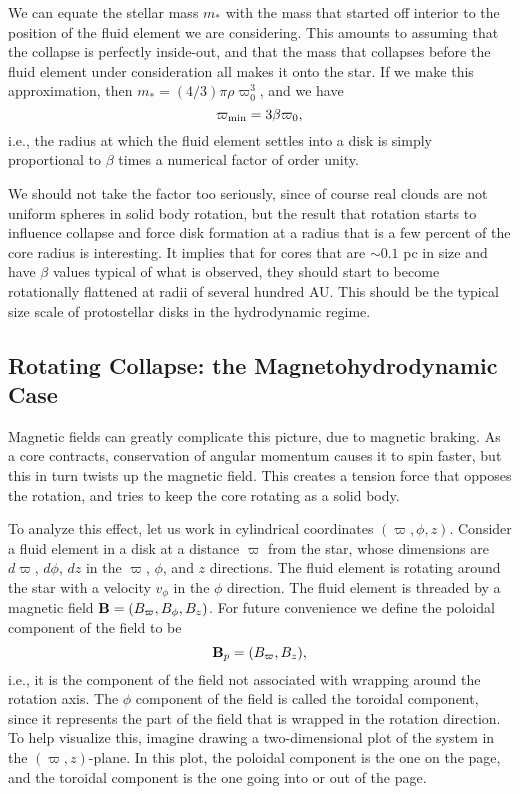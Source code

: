 We can equate the stellar mass $m_*$ with the mass that started off interior to the position of the fluid element we are considering. This amounts to assuming that the collapse is perfectly inside-out, and that the mass that collapses before the fluid element under consideration all makes it onto the star. If we make this approximation, then $m_*=(4/3)\pi \rho \varpi_0^3$, and we have
\begin{equation}
\varpi_{\rm min} = 3 \beta \varpi_0,
\end{equation}
i.e., the radius at which the fluid element settles into a disk is simply proportional to $\beta$ times a numerical factor of order unity.

We should not take the factor too seriously, since of course real clouds are not uniform spheres in solid body rotation, but the result that rotation starts to influence collapse and force disk formation at a radius that is a few percent of the core radius is interesting. It implies that for cores that are $\sim 0.1$ pc in size and have $\beta$ values typical of what is observed, they should start to become rotationally flattened at radii of several hundred AU. This should be the typical size scale of protostellar disks in the hydrodynamic regime.

\subsection{Rotating Collapse: the Magnetohydrodynamic Case}

Magnetic fields can greatly complicate this picture, due to magnetic braking. As a core contracts, conservation of angular momentum causes it to spin faster, but this in turn twists up the magnetic field. This creates a tension force that opposes the rotation, and tries to keep the core rotating as a solid body.

To analyze this effect, let us work in cylindrical coordinates $(\varpi, \phi, z)$. Consider a fluid element in a disk at a distance $\varpi$ from the star, whose dimensions are $d\varpi$, $d\phi$, $dz$ in the $\varpi$, $\phi$, and $z$ directions. The fluid element is rotating around the star with a velocity $v_{\phi}$ in the $\phi$ direction. The fluid element is threaded by a magnetic field $\mathbf{B}=(B_\varpi, B_\phi, B_z)$. For future convenience we define the poloidal component of the field to be
\begin{equation}
\mathbf{B}_p = (B_\varpi, B_z),
\end{equation}
i.e., it is the component of the field not associated with wrapping around the rotation axis. The $\phi$ component of the field is called the toroidal component, since it represents the part of the field that is wrapped in the rotation direction. To help visualize this, imagine drawing a two-dimensional plot of the system in the $(\varpi, z)$-plane. In this plot, the poloidal component is the one on the page, and the toroidal component is the one going into or out of the page.

